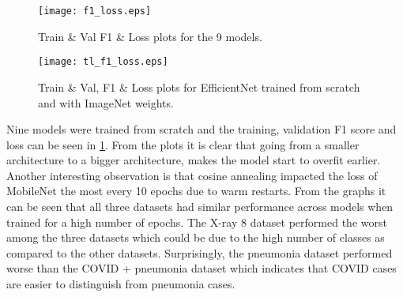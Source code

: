 \documentclass[10pt,twocolumn,letterpaper]{article}
\begin{document}
\begin{table*}[tbh]
  \centering
  \boldmath
  \caption{F1 (higher is better), time per epoch in seconds (lower is better), and number of epochs to reach the best validation loss (lower is better) for the 12 models that were trained.}
  \label{table:conducts}
  \end{table*}
  \begin{figure}[t]
    \centering
    \texttt{[image: f1\_loss.eps]}  
     \caption{Train \& Val F1 \& Loss plots for the 9 models.}
     \label{fig:acc_loss_sep}
  \end{figure}
  
  \begin{figure}[t]
    \centering
    \texttt{[image: tl\_f1\_loss.eps]}  
     \caption{Train \& Val, F1 \& Loss plots for EfficientNet trained from scratch and with ImageNet weights.}
     \label{fig:tl_acc_loss}
  \end{figure}
Nine models were trained from scratch and the training, validation F1 score and loss can be 
seen in \cref{fig:acc_loss_sep}. From the plots it is clear that going from a smaller 
architecture to a bigger architecture, makes the model start to overfit earlier. Another 
interesting observation is that cosine annealing impacted the loss of MobileNet the most 
every 10 epochs due to warm restarts. From the graphs it can be seen that all three 
datasets had similar performance across models when trained for a high number of epochs. 
The X-ray 8 dataset performed the worst among the three datasets which could be due to the 
high number of classes as compared to the other datasets. Surprisingly, the pneumonia 
dataset performed worse than the COVID + pneumonia dataset which indicates that COVID 
cases are easier to distinguish from pneumonia cases. 
\end{document}

